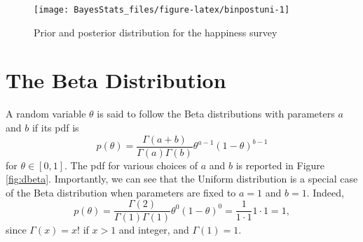 \documentclass[
]{book}
\begin{document}
\begin{figure}

{\centering \texttt{[image: BayesStats\_files/figure-latex/binpostuni-1]} 

}

\caption{Prior and posterior distribution for the happiness survey}\label{fig:binpostuni}
\end{figure}

\hypertarget{the-beta-distribution}{%
\section{The Beta Distribution}\label{the-beta-distribution}}

A random variable \(\theta\) is said to follow the Beta distributions with parameters \(a\) and \(b\) if its pdf is
\[
p(\theta)=\frac{\Gamma(a+b)}{\Gamma(a)\Gamma(b)}\theta^{a-1}(1-\theta)^{b-1}
\]
for \(\theta\in[0,1]\). The pdf for various choices of \(a\) and \(b\) is reported in Figure \ref{fig:dbeta}. Importantly, we can see that the Uniform distribution is a special case of the Beta distribution when parameters are fixed to \(a=1\) and \(b=1\). Indeed,
\[
p(\theta)=\frac{\Gamma(2)}{\Gamma(1)\Gamma(1)}\theta^{0}(1-\theta)^{0}=\frac{1}{1\cdot 1} 1\cdot 1 = 1,
\]
since \(\Gamma(x)=x!\) if \(x>1\) and integer, and \(\Gamma(1)=1\).
\end{document}
